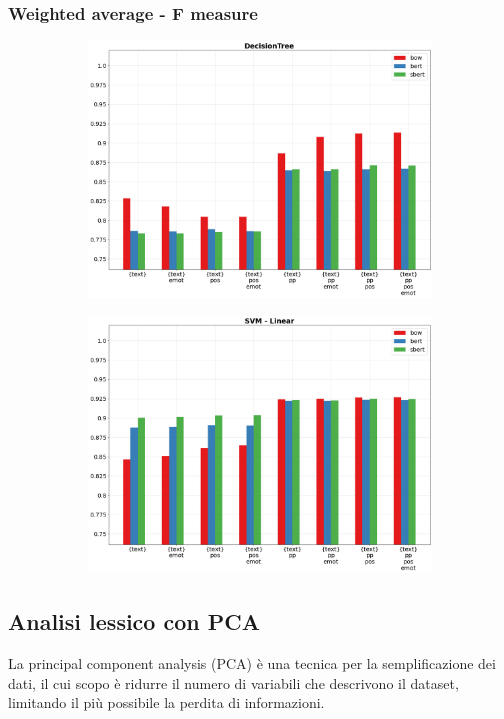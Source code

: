 \documentclass[oneside]{book}
\begin{document}
\subsubsection{Weighted average - F measure}

\begin{figure}[!h]
	\hspace*{-3cm}
	\begin{subfigure}[b]{0.5\textwidth}
		\centering
		\includegraphics[width=10cm]{assets/reports/text/f1/DecisionTree.png}
	\end{subfigure}
	\hfill
	\begin{subfigure}[b]{0.5\textwidth}		
		\centering
		\hspace*{0.15cm}
		\includegraphics[width=10cm]{assets/reports/text/f1/SVM - Linear.png}
	\end{subfigure}
\end{figure}
\newpage


\subsection{Analisi lessico con PCA}
La principal component analysis (PCA) è una tecnica per la semplificazione dei dati, il cui scopo è ridurre il numero di variabili che descrivono il dataset, limitando il più possibile la perdita di informazioni.
\end{document}
